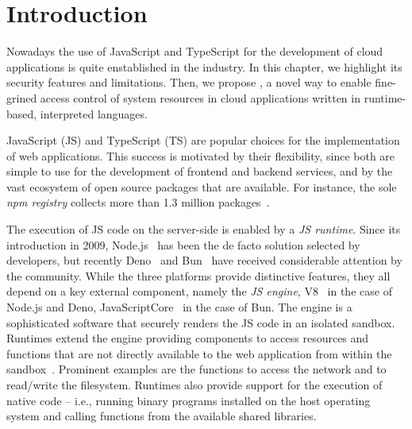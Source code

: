 \section{Introduction}
\label{sect:introduction}

Nowadays the use of JavaScript and TypeScript for the development of
cloud applications is quite enstablished in the industry. In this
chapter, we highlight its security features and limitations. Then, we
propose \natisand, a novel way to enable fine-grined access control of
system resources in cloud applications written in runtime-based,
interpreted languages.


JavaScript (JS) and TypeScript (TS) are popular choices for the
implementation of web applications. This success is motivated by their
flexibility, since both are simple to use for the development of
frontend and backend services, and by the vast ecosystem of open
source packages that are available. For instance, the sole {\em npm
  registry} collects more than 1.3 million
packages~\cite{npm-registry}.

The execution of JS code on the server-side is enabled by a {\em JS
  runtime}.  Since its introduction in 2009, Node.js~\cite{node} has
been the de facto solution selected by developers, but recently
Deno~\cite{deno} and Bun~\cite{bun} have received considerable
attention by the community. While the three platforms provide
distinctive features, they all depend on a key external component,
namely the {\em JS engine}, V8~\cite{v8-site} in the
case of Node.js and Deno, JavaScriptCore~\cite{javascriptcore} in the
case of Bun. The engine is a sophisticated software that securely
renders the JS code in an isolated sandbox. Runtimes extend the engine
providing components to access resources and functions that are not
directly available to the web application from within the
sandbox~\cite{node-api, deno-api}. Prominent examples are the
functions to access the network and to read/write the
filesystem. Runtimes also provide support for the execution of native
code -- i.e., running binary programs installed on the host operating
system and calling functions from the available shared libraries.

